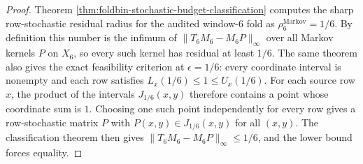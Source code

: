 \begin{proof}
Theorem \ref{thm:foldbin-stochastic-budget-classification} computes the sharp row-stochastic residual radius for the audited window-\(6\) fold as
\(
\rho_6^{\mathrm{Markov}}=1/6
\).
By definition this number is the infimum of \(\|T_6M_6-M_6P\|_\infty\) over all Markov kernels \(P\) on \(X_6\), so every such kernel has residual at least \(1/6\).
The same theorem also gives the exact feasibility criterion at \(\epsilon=1/6\): every coordinate interval is nonempty and each row satisfies \(L_x(1/6)\le1\le U_x(1/6)\).
For each source row \(x\), the product of the intervals \(J_{1/6}(x,y)\) therefore contains a point whose coordinate sum is \(1\).
Choosing one such point independently for every row gives a row-stochastic matrix \(P\) with \(P(x,y)\in J_{1/6}(x,y)\) for all \((x,y)\).
The classification theorem then gives \(\|T_6M_6-M_6P\|_\infty\le1/6\), and the lower bound forces equality. \qedhere
\end{proof}
